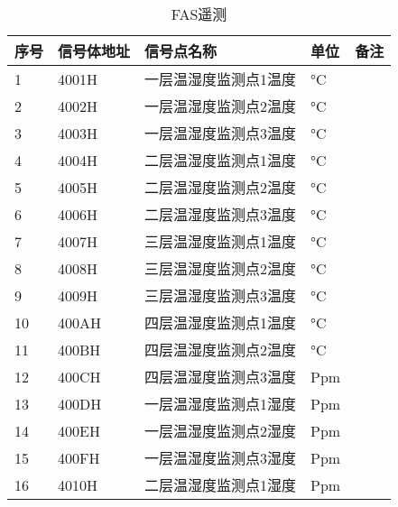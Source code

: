 \begin{longtable}[c]{|l|l|l|l|l|}
	\caption{FAS遥测}
	\label{tab:my-table}\\
	\hline
	\textbf{序号} & \textbf{信号体地址} & \textbf{信号点名称} & \textbf{单位} & \textbf{备注} \\ \hline
	\endfirsthead
	\endhead
	1           & 4001H          & 一层温湿度监测点1温度    & °C          &             \\ \hline
	2           & 4002H          & 一层温湿度监测点2温度    & °C          &             \\ \hline
	3           & 4003H          & 一层温湿度监测点3温度    & °C          &             \\ \hline
	4           & 4004H          & 二层温湿度监测点1温度    & °C          &             \\ \hline
	5           & 4005H          & 二层温湿度监测点2温度    & °C          &             \\ \hline
	6           & 4006H          & 二层温湿度监测点3温度    & °C          &             \\ \hline
	7           & 4007H          & 三层温湿度监测点1温度    & °C          &             \\ \hline
	8           & 4008H          & 三层温湿度监测点2温度    & °C          &             \\ \hline
	9           & 4009H          & 三层温湿度监测点3温度    & °C          &             \\ \hline
	10          & 400AH          & 四层温湿度监测点1温度    & °C          &             \\ \hline
	11          & 400BH          & 四层温湿度监测点2温度    & °C          &             \\ \hline
	12          & 400CH          & 四层温湿度监测点3温度    & Ppm         &             \\ \hline
	13          & 400DH          & 一层温湿度监测点1湿度    & Ppm         &             \\ \hline
	14          & 400EH          & 一层温湿度监测点2湿度    & Ppm         &             \\ \hline
	15          & 400FH          & 一层温湿度监测点3湿度    & Ppm         &             \\ \hline
	16          & 4010H          & 二层温湿度监测点1湿度    & Ppm         &             \\ \hline

\end{longtable}

